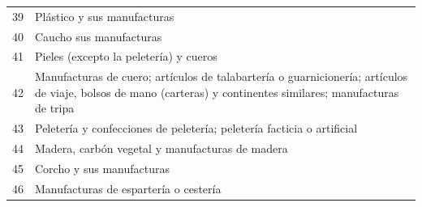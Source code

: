 \documentclass[a4paper,openright,12pt]{book}
\begin{document}
\begin{table}[]
{\begin{tabular}{@{}ll@{}}
39  & Plástico y sus manufacturas                                                                                                                                                                                                                                                                    \\
40  & Caucho sus manufacturas                                                                                                                                                                                                                                                                        \\
41  & Pieles (excepto la peletería) y cueros                                                                                                                                                                                                                                                         \\
42  & Manufacturas de cuero; artículos de talabartería o guarnicionería; artículos de viaje, bolsos de mano (carteras) y continentes similares; manufacturas de tripa                                                                                                                                \\
43  & Peletería y confecciones de peletería; peletería facticia o artificial                                                                                                                                                                                                                         \\
44  & Madera, carbón vegetal y manufacturas de madera                                                                                                                                                                                                                                                \\
45  & Corcho y sus manufacturas                                                                                                                                                                                                                                                                      \\
46  & Manufacturas de espartería o cestería                                                                                                                                                                                                                                                          \\

\end{tabular}}
\end{table}
\end{document}

